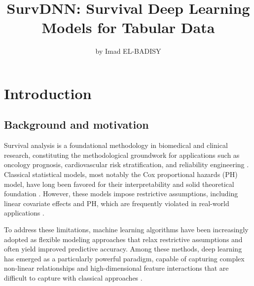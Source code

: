 \title{SurvDNN: Survival Deep Learning Models for Tabular Data}


\author{by Imad EL-BADISY}

\maketitle


\section{Introduction}\label{introduction}

\subsection{Background and motivation}\label{background-and-motivation}

Survival analysis is a foundational methodology in biomedical and clinical research, constituting the methodological groundwork for applications such as oncology prognosis, cardiovascular risk stratification, and reliability engineering \citep{wiegrebe2024deep}. Classical statistical models, most notably the Cox proportional hazards (PH) model, have long been favored for their interpretability and solid theoretical foundation \citep{cox1972regression}. However, these models impose restrictive assumptions, including linear covariate effects and PH, which are frequently violated in real-world applications \citep{heagerty2005survival, batson2016review}.

To address these limitations, machine learning algorithms have been increasingly adopted as flexible modeling approaches that relax restrictive assumptions and often yield improved predictive accuracy. Among these methods, deep learning has emerged as a particularly powerful paradigm, capable of capturing complex non-linear relationships and high-dimensional feature interactions that are difficult to capture with classical approaches \citep{wiegrebe2024deep, bengio2021deep}.

